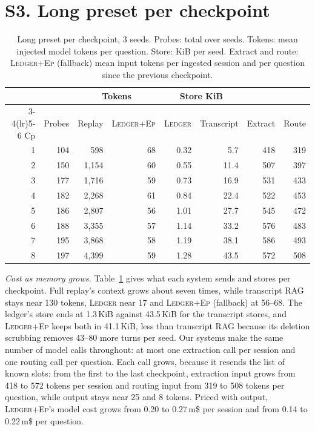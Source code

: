 \documentclass[10pt,conference]{IEEEtran}
\newcommand{\sys}{\textsc{Ledger}}
\newcommand{\hyb}{\textsc{Ledger+Ep}}
\begin{document}
\section*{S3. Long preset per checkpoint}
\begin{table}[t]
\caption{Long preset per checkpoint, 3 seeds. Probes: total over seeds. Tokens: mean injected model tokens per question. Store: KiB per seed. Extract and route: \hyb{} (fallback) mean input tokens per ingested session and per question since the previous checkpoint.}
\label{tab:s-growth}
\centering
\footnotesize
\setlength{\tabcolsep}{2.5pt}
\begin{tabular}{@{}rrrrrrrr@{}}
\toprule
 & & \multicolumn{2}{c}{Tokens} & \multicolumn{2}{c}{Store KiB} & & \\
\cmidrule(lr){3-4}\cmidrule(lr){5-6}
Cp & Probes & Replay & \hyb{} & \sys{} & Transcript & Extract & Route \\
\midrule
1 & 104 & 598 & 68 & 0.32 & 5.7 & 418 & 319 \\
2 & 150 & 1{,}154 & 60 & 0.55 & 11.4 & 507 & 397 \\
3 & 177 & 1{,}716 & 59 & 0.73 & 16.9 & 531 & 433 \\
4 & 182 & 2{,}268 & 61 & 0.84 & 22.4 & 522 & 453 \\
5 & 186 & 2{,}807 & 56 & 1.01 & 27.7 & 545 & 472 \\
6 & 188 & 3{,}355 & 57 & 1.14 & 33.2 & 576 & 483 \\
7 & 195 & 3{,}868 & 58 & 1.19 & 38.1 & 586 & 493 \\
8 & 197 & 4{,}399 & 59 & 1.28 & 43.5 & 572 & 508 \\
\bottomrule
\end{tabular}
\end{table}

\emph{Cost as memory grows.} Table~\ref{tab:s-growth} gives what each system sends and stores per checkpoint. Full replay's context grows about seven times, while transcript RAG stays near 130 tokens, \sys{} near 17 and \hyb{} (fallback) at 56--68. The ledger's store ends at 1.3\,KiB against 43.5\,KiB for the transcript stores, and \hyb{} keeps both in 41.1\,KiB, less than transcript RAG because its deletion scrubbing removes 43--80 more turns per seed. Our systems make the same number of model calls throughout: at most one extraction call per session and one routing call per question. Each call grows, because it resends the list of known slots: from the first to the last checkpoint, extraction input grows from 418 to 572 tokens per session and routing input from 319 to 508 tokens per question, while output stays near 25 and 8 tokens. Priced with output, \hyb{}'s model cost grows from 0.20 to 0.27\,m\$ per session and from 0.14 to 0.22\,m\$ per question.
\end{document}

